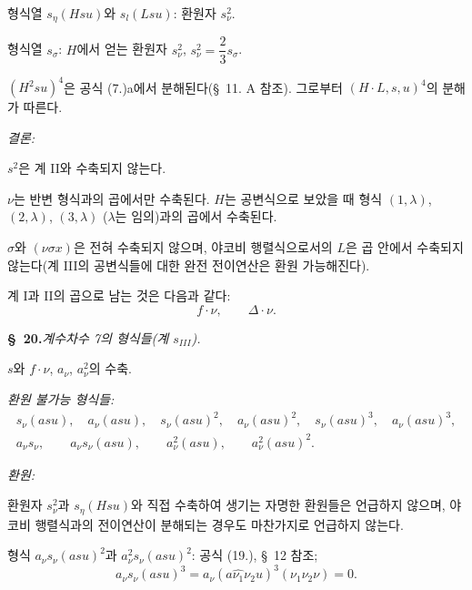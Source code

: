 형식열 $s_\eta(Hsu)$와 $s_l(Lsu)$: 환원자 $s_\nu^2$.

형식열 $s_\sigma$: $H$에서 얻는 환원자 $s_\nu^2$,
$s_\nu^2=\dfrac23s_\sigma$.

$(H^2su)^4$은 공식 (7.)a에서 분해된다(\S\ 11. A 참조). 그로부터 $(H\cdot L,s,u)^4$의 분해가 따른다.

\noindent\emph{결론:}

$s^2$은 계 II와 수축되지 않는다.

$\nu$는 반변 형식과의 곱에서만 수축된다. $H$는 공변식으로 보았을 때 형식 $(1,\lambda)$, $(2,\lambda)$, $(3,\lambda)$ ($\lambda$는 임의)과의 곱에서 수축된다.

$\sigma$와 $(\nu\sigma x)$은 전혀 수축되지 않으며, 야코비 행렬식으로서의 $L$은 곱 안에서 수축되지 않는다(계 III의 공변식들에 대한 완전 전이연산은 환원 가능해진다).

계 I과 II의 곱으로 남는 것은 다음과 같다:
\[
f\cdot \nu,\qquad \Delta\cdot \nu.
\]

\begin{center}
\textbf{\S\ 20.}\quad\emph{계수차수 7의 형식들(계 $s_{III}$).}
\end{center}

$s$와 $f\cdot \nu$, $a_\nu$, $a_\nu^2$의 수축.

\noindent\emph{환원 불가능 형식들:}
\[
\begin{gathered}
s_\nu(asu),\quad a_\nu(asu),\quad s_\nu(asu)^2,\quad a_\nu(asu)^2,\quad
s_\nu(asu)^3,\quad a_\nu(asu)^3,\\
a_\nu s_\nu,\qquad a_\nu s_\nu(asu),\qquad a_\nu^2(asu),\qquad a_\nu^2(asu)^2.
\end{gathered}
\]

\noindent\emph{환원:}

환원자 $s_\nu^2$과 $s_\eta(Hsu)$와 직접 수축하여 생기는 자명한 환원들은 언급하지 않으며, 야코비 행렬식과의 전이연산이 분해되는 경우도 마찬가지로 언급하지 않는다.

형식 $a_\nu s_\nu(asu)^2$과 $a_\nu^2s_\nu(asu)^2$: 공식 (19.), \S\ 12 참조;
\[
a_\nu s_\nu(asu)^3=a_\nu(a\widehat{\nu_1}\nu_2u)^3(\nu_1\nu_2\nu)=0.
\]

